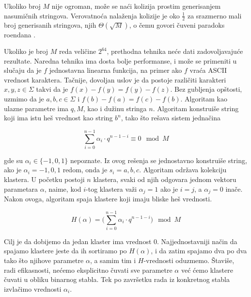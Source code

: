 Ukoliko broj $M$ nije ogroman, mo\v ze se na\' ci kolizija prostim generisanjem nasumi\v cnih stringova. Verovatno\' ca nala\v zenja kolizije je oko $\frac12$ za srazmerno mali broj generisanih stringova, njih $\Theta(\sqrt M)$, o \v cemu govori \v cuveni paradoks ro\dj endana \cite{birthdayrad}.

\noindent
\begin{minipage}[l]{\textwidth}

\end{minipage}

Ukoliko je broj $M$ reda veli\v cine $2^{64}$, prethodna tehnika ne\' ce dati zadovoljavaju\' ce rezultate. Naredna tehnika ima dosta bolje performanse, i mo\v ze se primeniti u slu\v caju da je $f$ jednostavna linearna funkcija, na primer ako $f$ vra\' ca ASCII vrednost karaktera. Ta\v cnije, dovoljan uslov je da postoje razli\v citi karakteri $x,y,z \in \Sigma$ takvi da je $f(x)-f(y) = f(y)-f(z)$. Bez gubljenja op\v stosti, uzmimo da je $a,b,c \in \Sigma$ i $f(b) - f(a) = f(c) - f(b)$. Algoritam kao ulazne parametre ima $q,M$, kao i du\v zinu stringa $n$. Algoritam konstrui\v se string koji ima istu he\v s vrednost kao string $b^n$, tako \v sto re\v sava sistem jedna\v cina

\begin{equation}
    \sum_{i=0}^{n-1} \alpha_i \cdot q^{n-1-i} \equiv 0 \mod M
\end{equation}

gde su $\alpha_i \in \{-1, 0, 1\}$ nepoznate. Iz ovog re\v senja se jednostavno konstrui\v se string, ako je $\alpha_i = -1,0,1$ redom, onda je $s_i = a,b,c$. Algoritam odr\v zava kolekciju klastera. U po\v cetku postoji $n$ klastera, svaki od njih odgovara jednom vektoru parametara $\alpha$, naime, kod $i$-tog klastera va\v zi $\alpha_j = 1$ ako je $i=j$, a $\alpha_j = 0$ ina\v ce. Nakon ovoga, algoritam spaja klastere koji imaju bliske he\v s vrednosti.

\begin{equation}
    H(\alpha) = \Big(\sum_{i=0}^{n-1} \alpha_i \cdot q^{n-1-i}\Big) \mod M
\end{equation}

Cilj je da dobijemo da jedan klaster ima vrednost $0$. Najjednostavniji na\v cin da spajamo klastere jeste da ih sortiramo po $H(\alpha)$, i da zatim spajamo dva po dva tako \v sto njihove parametre $\alpha$, a samim tim i $H$-vrednosti oduzmemo. \v Stavi\v se, radi efikasnosti, ne\' cemo eksplicitno \v cuvati sve parametre $\alpha$ ve\' c \' cemo klastere \v cuvati u obliku binarnog stabla. Tek po zavr\v setku rada iz konkretnog stabla izvla\v cimo vrednosti $\alpha_i$.

